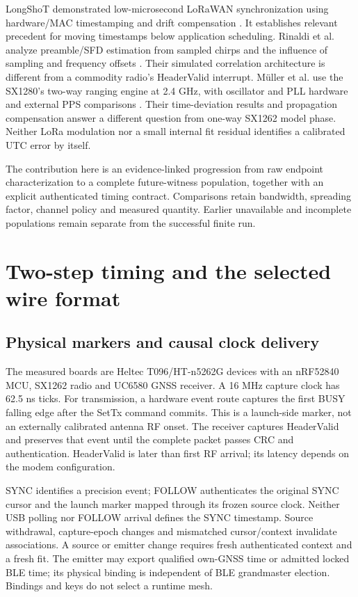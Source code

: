 \documentclass[10pt,letterpaper]{article}
\begin{document}
LongShoT demonstrated low-microsecond LoRaWAN synchronization using
hardware/MAC timestamping and drift compensation \cite{longshot}. It establishes
relevant precedent for moving timestamps below application scheduling.
Rinaldi et al. analyze preamble/SFD estimation from sampled chirps and the
influence of sampling and frequency offsets \cite{rinaldi}. Their simulated
correlation architecture is different from a commodity radio's HeaderValid
interrupt. M\"uller et al. use the SX1280's two-way ranging engine at 2.4 GHz,
with oscillator and PLL hardware and external PPS comparisons \cite{mueller}.
Their time-deviation results and propagation compensation answer a different
question from one-way SX1262 model phase. Neither LoRa modulation nor a small
internal fit residual identifies a calibrated UTC error by itself.

The contribution here is an evidence-linked progression from raw endpoint
characterization to a complete future-witness population, together with an
explicit authenticated timing contract. Comparisons retain bandwidth,
spreading factor, channel policy and measured quantity. Earlier unavailable
and incomplete populations remain separate from the successful finite run.
\clearpage

\section{Two-step timing and the selected wire format}
\subsection{Physical markers and causal clock delivery}
The measured boards are Heltec T096/HT-n5262G devices with an nRF52840 MCU,
SX1262 radio and UC6580 GNSS receiver. A 16 MHz capture clock has 62.5 ns ticks.
For transmission, a hardware event route captures the first BUSY falling edge
after the SetTx command commits. This is a launch-side marker, not an externally
calibrated antenna RF onset. The receiver captures HeaderValid and preserves
that event until the complete packet passes CRC and authentication. HeaderValid
is later than first RF arrival; its latency depends on the modem configuration.

SYNC identifies a precision event; FOLLOW authenticates the original SYNC
cursor and the launch marker mapped through its frozen source clock. Neither
USB polling nor FOLLOW arrival defines the SYNC timestamp. Source withdrawal,
capture-epoch changes and mismatched cursor/context invalidate associations.
A source or emitter change requires fresh authenticated context and a fresh fit.
The emitter may export qualified own-GNSS time or admitted locked BLE time;
its physical binding is independent of BLE grandmaster election. Bindings and
keys do not select a runtime mesh.
\end{document}
